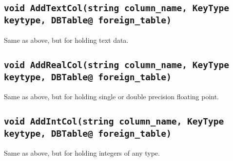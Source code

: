 \documentclass{book}
\begin{document}
\subsection{\texttt{void AddTextCol(string column\_name, KeyType keytype, DBTable@ foreign\_table)}}
Same as above, but for holding text data.
\subsection{\texttt{void AddRealCol(string column\_name, KeyType keytype, DBTable@ foreign\_table)}}
Same as above, but for holding single or double precision floating point.
\subsection{\texttt{void AddIntCol(string column\_name, KeyType keytype, DBTable@ foreign\_table)}}
Same as above, but for holding integers of any type.
\end{document}
